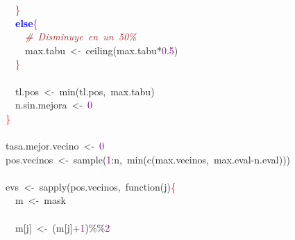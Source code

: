 \mbox{}\ \ \ \ \ \ \textcolor{Red}{\}} \\
\mbox{}\ \ \ \ \ \ \textbf{\textcolor{Blue}{else}}\textcolor{Red}{\{} \\
\mbox{}\ \ \ \ \ \ \ \ \textit{\textcolor{Brown}{\#\ Disminuye\ en\ un\ 50\%}} \\
\mbox{}\ \ \ \ \ \ \ \ max\textcolor{BrickRed}{.}tabu\ \textcolor{BrickRed}{\textless{}-}\ ceiling\textcolor{BrickRed}{(}max\textcolor{BrickRed}{.}tabu\textcolor{BrickRed}{*}\textcolor{Purple}{0.5}\textcolor{BrickRed}{)} \\
\mbox{}\ \ \ \ \ \ \textcolor{Red}{\}} \\
\mbox{}\ \ \ \ \ \  \\
\mbox{}\ \ \ \ \ \ tl\textcolor{BrickRed}{.}pos\ \textcolor{BrickRed}{\textless{}-}\ min\textcolor{BrickRed}{(}tl\textcolor{BrickRed}{.}pos\textcolor{BrickRed}{,}\ max\textcolor{BrickRed}{.}tabu\textcolor{BrickRed}{)} \\
\mbox{}\ \ \ \ \ \ n\textcolor{BrickRed}{.}sin\textcolor{BrickRed}{.}mejora\ \textcolor{BrickRed}{\textless{}-}\ \textcolor{Purple}{0} \\
\mbox{}\ \ \ \ \textcolor{Red}{\}} \\
\mbox{}\ \ \ \  \\
\mbox{}\ \ \ \ tasa\textcolor{BrickRed}{.}mejor\textcolor{BrickRed}{.}vecino\ \textcolor{BrickRed}{\textless{}-}\ \textcolor{Purple}{0} \\
\mbox{}\ \ \ \ pos\textcolor{BrickRed}{.}vecinos\ \textcolor{BrickRed}{\textless{}-}\ sample\textcolor{BrickRed}{(}\textcolor{Purple}{1}\textcolor{BrickRed}{:}n\textcolor{BrickRed}{,}\ min\textcolor{BrickRed}{(}c\textcolor{BrickRed}{(}max\textcolor{BrickRed}{.}vecinos\textcolor{BrickRed}{,}\ max\textcolor{BrickRed}{.}eval\textcolor{BrickRed}{-}n\textcolor{BrickRed}{.}eval\textcolor{BrickRed}{)))} \\
\mbox{}\ \ \ \  \\
\mbox{}\ \ \ \ evs\ \textcolor{BrickRed}{\textless{}-}\ sapply\textcolor{BrickRed}{(}pos\textcolor{BrickRed}{.}vecinos\textcolor{BrickRed}{,}\ function\textcolor{BrickRed}{(}j\textcolor{BrickRed}{)}\textcolor{Red}{\{} \\
\mbox{}\ \ \ \ \ \ m\ \textcolor{BrickRed}{\textless{}-}\ mask \\
\mbox{}\ \ \ \ \ \  \\
\mbox{}\ \ \ \ \ \ m\textcolor{BrickRed}{[}j\textcolor{BrickRed}{]}\ \textcolor{BrickRed}{\textless{}-}\ \textcolor{BrickRed}{(}m\textcolor{BrickRed}{[}j\textcolor{BrickRed}{]+}\textcolor{Purple}{1}\textcolor{BrickRed}{)\%\%}\textcolor{Purple}{2} \\
